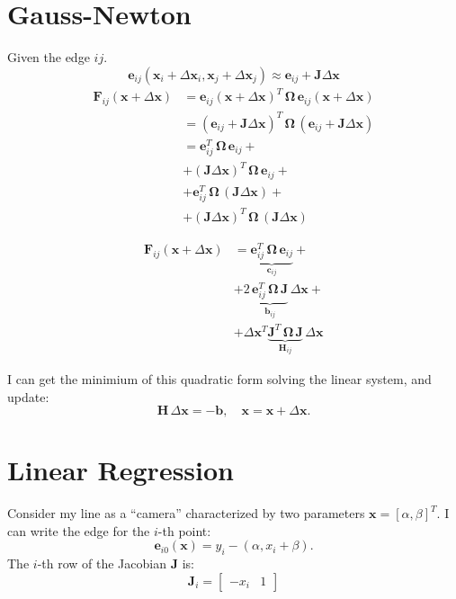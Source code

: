 \documentclass[a4paper]{article}
\newcommand{\bfe}{\mathbf{e}}
\newcommand{\bfc}{\mathbf{c}}
\newcommand{\bfb}{\mathbf{b}}
\newcommand{\bfx}{\mathbf{x}}
\newcommand{\bfJ}{\mathbf{J}}
\newcommand{\bfH}{\mathbf{H}}
\newcommand{\bfF}{\mathbf{F}}
\newcommand{\bfOmega}{\bm{\Omega}}
\begin{document}
\section*{Gauss-Newton}

Given the edge $ij$.
\[
\bfe_{ij}(\bfx_i + \Delta \bfx_i,\bfx_j + \Delta \bfx_j )\approx \bfe_{ij}+ \bfJ\Delta\bfx
\]
\begin{align}
\bfF_{ij}(\bfx+\Delta \bfx) & = \bfe_{ij}(\bfx + \Delta \bfx)^T\,\bfOmega\,\bfe_{ij}(\bfx + \Delta \bfx)\nonumber\\
                            & = (\bfe_{ij}+ \bfJ\Delta\bfx)^T\,\bfOmega\,(\bfe_{ij}+ \bfJ\Delta\bfx)\nonumber\\
                            & = \bfe_{ij}^T\, \bfOmega\, \bfe_{ij} + \nonumber\\
                            & + (\bfJ\Delta\bfx)^T\,\bfOmega\,\bfe_{ij} + \nonumber\\
                            & + \bfe_{ij}^T\,\bfOmega\,(\bfJ\Delta\bfx) + \nonumber\\
                            & + (\bfJ\Delta\bfx)^T\,\bfOmega\, (\bfJ\Delta\bfx) \nonumber
\end{align}

\begin{align}
\bfF_{ij}(\bfx+\Delta \bfx) & = \underbrace{\bfe_{ij}^T\, \bfOmega\, \bfe_{ij}}_{\bfc_{ij}} + \nonumber\\
                            & + 2\,\underbrace{\bfe_{ij}^T\,\bfOmega\, \bfJ}_{\bfb_{ij}}\,\Delta\bfx + \nonumber\\
                            & + \Delta\bfx^T\underbrace{\bfJ^T\,\bfOmega\, \bfJ}_{\bfH_{ij}}\,\Delta\bfx \nonumber
\end{align}

I can get the minimium of this quadratic form solving the linear system, and update:
\[
\bfH\, \Delta\bfx = -\bfb, \quad \bfx = \bfx+\Delta\bfx.
\]


\section*{Linear Regression}
Consider my line as a ``camera'' characterized by two parameters $\bfx = [\alpha,\beta]^T$. I can write
the edge for the $i$-th point:
\[
\bfe_{i0}(\bfx) = y_i  - (\alpha, x_i+\beta).
\]
The $i$-th row of the Jacobian $\bfJ$ is:
\[
\bfJ_i = \left[
\begin{array}{cc}
  -x_i & 1
\end{array}
\right]
\]
\end{document}
